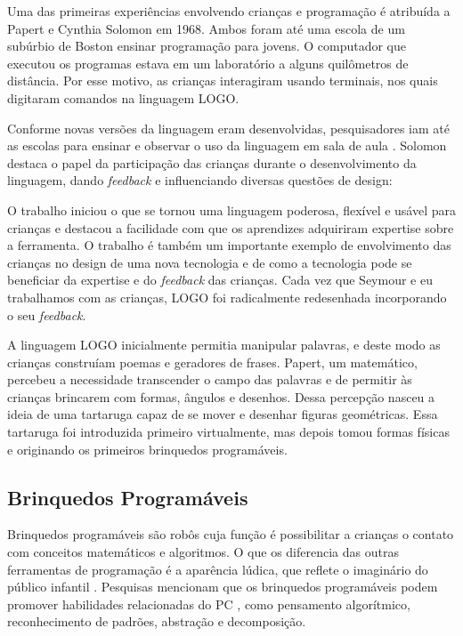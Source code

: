 Uma das primeiras experiências envolvendo crianças e programação é atribuída a Papert e Cynthia Solomon em 1968. Ambos foram até uma escola de um subúrbio de Boston ensinar programação para jovens. O computador que executou os programas estava em um laboratório a alguns quilômetros de distância. Por esse motivo, as crianças interagiram usando terminais, nos quais digitaram comandos na linguagem LOGO.

Conforme novas versões da linguagem eram desenvolvidas, pesquisadores iam até as escolas para ensinar e observar o uso da linguagem em sala de aula \cite{bers_coding_2018}. Solomon destaca o papel da participação das crianças durante o desenvolvimento da linguagem, dando \textit{feedback} e influenciando diversas questões de design:

\begin{citacao}
O trabalho iniciou o que se tornou uma linguagem poderosa, flexível e usável para crianças e destacou a facilidade com que os aprendizes adquiriram expertise sobre a ferramenta. O trabalho é também um importante exemplo de envolvimento das crianças no design de uma nova tecnologia e de como a tecnologia pode se beneficiar da expertise e do \textit{feedback} das crianças. Cada vez que Seymour e eu trabalhamos com as crianças, LOGO foi radicalmente redesenhada incorporando o seu \textit{feedback}.
\end{citacao}

A linguagem LOGO inicialmente permitia manipular palavras, e deste modo as crianças construíam poemas e geradores de frases. Papert, um matemático, percebeu a necessidade transcender o campo das palavras e de permitir às crianças brincarem com formas, ângulos e desenhos. Dessa percepção nasceu a ideia de uma tartaruga capaz de se mover e desenhar figuras geométricas. Essa tartaruga foi introduzida primeiro virtualmente, mas depois tomou formas físicas e originando os primeiros brinquedos programáveis.

\subsection{Brinquedos Programáveis}
\label{brinquedos_programaveis}
Brinquedos programáveis são robôs cuja função é possibilitar a crianças o contato com conceitos matemáticos e algoritmos. O que os diferencia das outras ferramentas de programação é a aparência lúdica, que reflete o imaginário do público infantil \cite{raabe_2017_rope}. Pesquisas mencionam que os brinquedos programáveis podem promover habilidades relacionadas do \ac{PC} \cite{repiso_robotics_2019, bers_coding_2018, pugnali_impact_2017,  bers_computational_2014}, como pensamento algorítmico, reconhecimento de padrões, abstração e decomposição.

